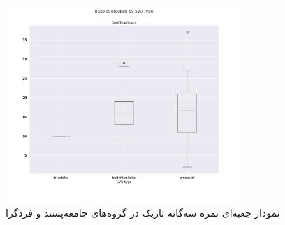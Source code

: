 \begin{figure}[htpb]
    \centering
    \includegraphics[width=0.8\textwidth]{./img/BoxPlotDTRSVOTypeProsocialBoxPlotDTRSVOTypeIndivisualistTTESTIndPValueReport.png}
    \caption{نمودار جعبه‌ای نمره سه‌گانه تاریک در گروه‌های جامعه‌پسند و فرد‌گرا}
    \label{fig:BoxPlotDTRSVOTypeProsocialBoxPlotDTRSVOTypeIndivisualistTTESTIndPValueReport}
\end{figure}

